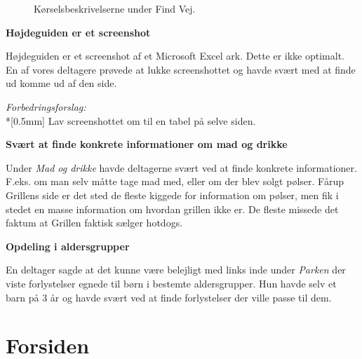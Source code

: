 \documentclass[10pt,a4paper]{article}      %
\newcommand{\kommentar}[2]{\item[#1] \textbf{#2}\par\nopagebreak}{}
\newenvironment{forslag}{\emph{Forbedringsforslag:}\\*[0.5mm]}{}
\newcommand\pic[1]{\texttt{[image: Pics/\#1]}}
\renewcommand\goodidea{\pic{goodidea}}
\renewcommand\smallproblem{\pic{smallproblem}}
\begin{document}
\begin{kommentarer}
\begin{figure}[htbp]
    \centering
    \caption{Kørselsbeskrivelserne under Find Vej.}
    \label{fig:koerselsbeskrivelse}
\end{figure}

\kommentar{\smallproblem}{Højdeguiden er et screenshot}

Højdeguiden er et screenshot af et Microsoft Excel ark. Dette er ikke optimalt.
En af vores deltagere prøvede at lukke screenshottet og havde svært med at finde
ud komme ud af den side.

\begin{forslag}
Lav screenshottet om til en tabel på selve siden.
\end{forslag}

\kommentar{\smallproblem}{Svært at finde konkrete informationer om mad og drikke}

Under \emph{Mad og drikke} havde deltagerne svært ved at finde konkrete
informationer. F.eks. om man selv måtte tage mad med, eller om der blev solgt
pølser. Fårup Grillens side er det sted de fleste kiggede for information om
pølser, men fik i stedet en masse information om hvordan grillen ikke er. De
fleste missede det faktum at Grillen faktisk sælger hotdogs.

\kommentar{\goodidea}{Opdeling i aldersgrupper}

En deltager sagde at det kunne være belejligt med links inde under \emph{Parken} der viste
forlystelser egnede til børn i bestemte aldersgrupper. Hun havde selv et barn på 3 år og havde
svært ved at finde forlystelser der ville passe til dem.

\end{kommentarer}


\section{Forsiden}
\end{document}
